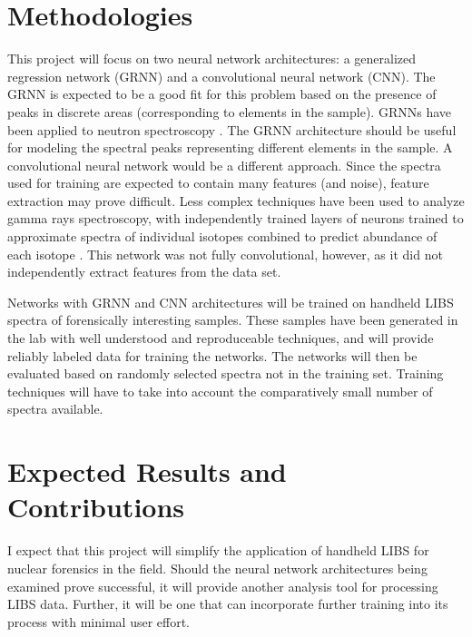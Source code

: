 \documentclass{article}
\begin{document}
\section{Methodologies}
This project will focus on two neural network architectures: a generalized regression network (GRNN) and a convolutional neural network (CNN). The GRNN is expected to be a good fit for this problem based on the presence of peaks in discrete areas (corresponding to elements in the sample). GRNNs have been applied to neutron spectroscopy \cite{Martinez-blanco2016}. The GRNN architecture should be useful for modeling the spectral peaks representing different elements in the sample. A convolutional neural network would be a different approach. Since the spectra used for training are expected to contain many features (and noise), feature extraction may prove difficult. Less complex techniques have been used to analyze gamma rays spectroscopy, with independently trained layers of neurons trained to approximate spectra of individual isotopes combined to predict abundance of each isotope \cite{Lagari2017}. This network was not fully convolutional, however, as it did not independently extract features from the data set.

Networks with GRNN and CNN architectures will be trained on handheld LIBS spectra of forensically interesting samples. These samples have been generated in the lab with well understood and reproduceable techniques, and will provide reliably labeled data for training the networks. The networks will then be evaluated based on randomly selected spectra not in the training set. Training techniques will have to take into account the comparatively small number of spectra available.

\section{Expected Results and Contributions}
I expect that this project will simplify the application of handheld LIBS for nuclear forensics in the field. Should the neural network architectures being examined prove successful, it will provide another analysis tool for processing LIBS data. Further, it will be one that can incorporate further training into its process with minimal user effort.

\printbibliography
\end{document}
